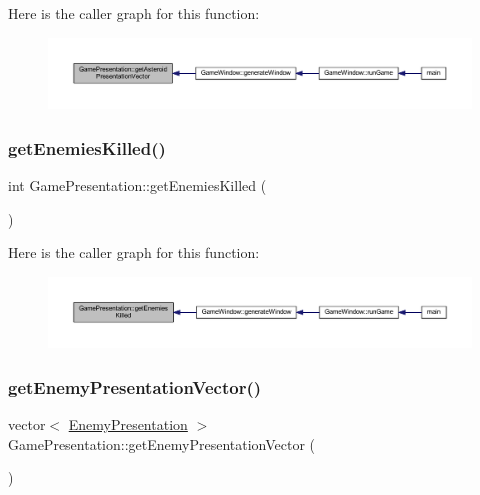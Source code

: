 Here is the caller graph for this function\+:\nopagebreak
\begin{figure}[H]
\begin{center}
\leavevmode
\includegraphics[width=350pt]{class_game_presentation_a28a7d4fb65413d6a10b960721aaca0d2_icgraph}
\end{center}
\end{figure}
\mbox{\label{class_game_presentation_ab09fbeaf4a3dfd753f1bce5cdd78969e}} 
\subsubsection{\texorpdfstring{get\+Enemies\+Killed()}{getEnemiesKilled()}}
{\footnotesize\ttfamily int Game\+Presentation\+::get\+Enemies\+Killed (\begin{DoxyParamCaption}{ }\end{DoxyParamCaption})}

Here is the caller graph for this function\+:\nopagebreak
\begin{figure}[H]
\begin{center}
\leavevmode
\includegraphics[width=350pt]{class_game_presentation_ab09fbeaf4a3dfd753f1bce5cdd78969e_icgraph}
\end{center}
\end{figure}
\mbox{\label{class_game_presentation_a903a8e09c19324b2380b5073abd570f0}} 
\subsubsection{\texorpdfstring{get\+Enemy\+Presentation\+Vector()}{getEnemyPresentationVector()}}
{\footnotesize\ttfamily vector$<$ \hyperlink{class_enemy_presentation}{Enemy\+Presentation} $>$ Game\+Presentation\+::get\+Enemy\+Presentation\+Vector (\begin{DoxyParamCaption}{ }\end{DoxyParamCaption})}

